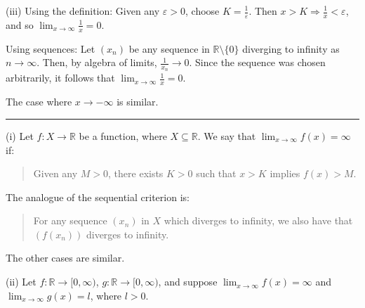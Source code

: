 \documentclass[letterpaper,10pt,english]{jupyterBook}
\begin{document}
\sphinxAtStartPar
(iii) Using the definition: Given any \(\varepsilon > 0\), choose \(K = \frac{1}{\varepsilon}\). Then \(x > K \Rightarrow \frac{1}{x} < \varepsilon\), and so \(\lim_{x\to\infty} \frac{1}{x}=0\).

\sphinxAtStartPar
Using sequences: Let \((x_n)\) be any sequence in \(\mathbb{R}\setminus\{0\}\) diverging to infinity as \(n\rightarrow\infty\). Then, by algebra of limits, \(\frac{1}{x_n}\rightarrow 0\). Since the sequence was chosen arbitrarily, it follows that \(\lim_{x\rightarrow\infty}\frac{1}{x}=0\).

\sphinxAtStartPar
The case where \(x\to-\infty\) is similar.


\bigskip\hrule\bigskip


\sphinxAtStartPar
{\hyperref[\detokenize{Problems:id12}]{}}
(i) Let \(f:X\to\mathbb{R}\) be a function, where \(X\subseteq\mathbb{R}\). We say that \(\lim_{x \rightarrow \infty} f(x) = \infty\) if:
\begin{quote}

\sphinxAtStartPar
Given any \(M > 0\), there exists \(K > 0\) such that \(x > K\) implies \(f(x) > M\).
\end{quote}

\sphinxAtStartPar
The analogue of the sequential criterion is:
\begin{quote}

\sphinxAtStartPar
For any sequence \((x_{n})\) in \(X\) which diverges to infinity, we also have that \((f(x_{n}))\) diverges to infinity.
\end{quote}

\sphinxAtStartPar
The other cases are similar.

\sphinxAtStartPar
(ii) Let \(f:\mathbb{R}\to[0,\infty)\), \(g:\mathbb{R}\to[0,\infty)\), and suppose \(\displaystyle\lim_{x\rightarrow\infty}f(x)=\infty\) and \(\displaystyle\lim_{x\rightarrow\infty}g(x)=l\), where \(l>0\).
\end{document}
